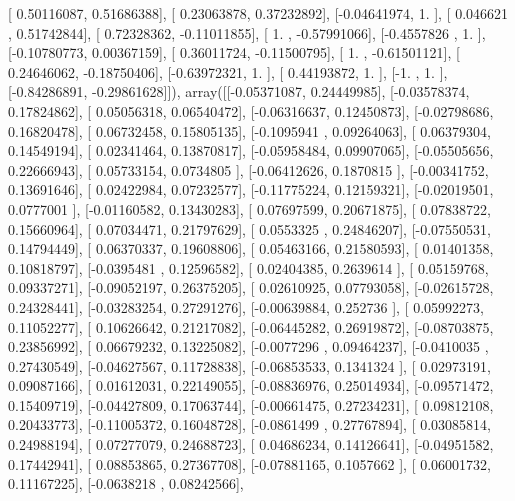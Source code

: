\documentclass{article}
\begin{document}
       [ 0.50116087,  0.51686388],
       [ 0.23063878,  0.37232892],
       [-0.04641974,  1.        ],
       [ 0.046621  ,  0.51742844],
       [ 0.72328362, -0.11011855],
       [ 1.        , -0.57991066],
       [-0.4557826 ,  1.        ],
       [-0.10780773,  0.00367159],
       [ 0.36011724, -0.11500795],
       [ 1.        , -0.61501121],
       [ 0.24646062, -0.18750406],
       [-0.63972321,  1.        ],
       [ 0.44193872,  1.        ],
       [-1.        ,  1.        ],
       [-0.84286891, -0.29861628]]), array([[-0.05371087,  0.24449985],
       [-0.03578374,  0.17824862],
       [ 0.05056318,  0.06540472],
       [-0.06316637,  0.12450873],
       [-0.02798686,  0.16820478],
       [ 0.06732458,  0.15805135],
       [-0.1095941 ,  0.09264063],
       [ 0.06379304,  0.14549194],
       [ 0.02341464,  0.13870817],
       [-0.05958484,  0.09907065],
       [-0.05505656,  0.22666943],
       [ 0.05733154,  0.0734805 ],
       [-0.06412626,  0.1870815 ],
       [-0.00341752,  0.13691646],
       [ 0.02422984,  0.07232577],
       [-0.11775224,  0.12159321],
       [-0.02019501,  0.0777001 ],
       [-0.01160582,  0.13430283],
       [ 0.07697599,  0.20671875],
       [ 0.07838722,  0.15660964],
       [ 0.07034471,  0.21797629],
       [ 0.0553325 ,  0.24846207],
       [-0.07550531,  0.14794449],
       [ 0.06370337,  0.19608806],
       [ 0.05463166,  0.21580593],
       [ 0.01401358,  0.10818797],
       [-0.0395481 ,  0.12596582],
       [ 0.02404385,  0.2639614 ],
       [ 0.05159768,  0.09337271],
       [-0.09052197,  0.26375205],
       [ 0.02610925,  0.07793058],
       [-0.02615728,  0.24328441],
       [-0.03283254,  0.27291276],
       [-0.00639884,  0.252736  ],
       [ 0.05992273,  0.11052277],
       [ 0.10626642,  0.21217082],
       [-0.06445282,  0.26919872],
       [-0.08703875,  0.23856992],
       [ 0.06679232,  0.13225082],
       [-0.0077296 ,  0.09464237],
       [-0.0410035 ,  0.27430549],
       [-0.04627567,  0.11728838],
       [-0.06853533,  0.1341324 ],
       [ 0.02973191,  0.09087166],
       [ 0.01612031,  0.22149055],
       [-0.08836976,  0.25014934],
       [-0.09571472,  0.15409719],
       [-0.04427809,  0.17063744],
       [-0.00661475,  0.27234231],
       [ 0.09812108,  0.20433773],
       [-0.11005372,  0.16048728],
       [-0.0861499 ,  0.27767894],
       [ 0.03085814,  0.24988194],
       [ 0.07277079,  0.24688723],
       [ 0.04686234,  0.14126641],
       [-0.04951582,  0.17442941],
       [ 0.08853865,  0.27367708],
       [-0.07881165,  0.1057662 ],
       [ 0.06001732,  0.11167225],
       [-0.0638218 ,  0.08242566],
\end{document}
